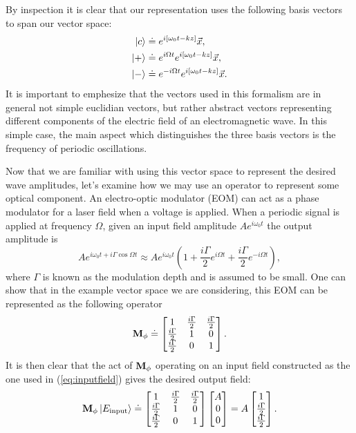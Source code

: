 By inspection it is clear that our representation uses the following basis vectors to span our vector space:
\begin{align}
\left| c \right>&\doteq e^{i[\omega_0 t-kz]}\vec{x}\notag, \\
\left| + \right>&\doteq e^{i\Omega t}e^{i[\omega_0 t-kz]}\vec{x}, \\
\left| - \right>&\doteq e^{-i\Omega t}e^{i[\omega_0 t-kz]}\vec{x}\notag.
\end{align}
It is important to emphesize that the vectors used in this formalism are in general not simple euclidian vectors, but rather abstract vectors representing different components of the electric field of an electromagnetic wave. %
In this simple case, the main aspect which distinguishes the three basis vectors is the frequency of periodic oscillations. %


Now that we are familiar with using this vector space to represent the desired wave amplitudes, let's examine how we may use an operator to represent some optical component. %
An electro-optic modulator (EOM) can act as a phase modulator for a laser field when a voltage is applied. %
When a periodic signal is applied at frequency $\Omega$, given an input field amplitude $Ae^{i\omega_0 t}$ the output amplitude is
\newcommand{\gammahalf}{\frac{i\Gamma}{2}}
\begin{equation}
\label{eq:inputfield}
Ae^{i\omega_0 t + i\Gamma \cos{\Omega t}}\approx Ae^{i\omega_0 t}\left(1+\gammahalf e^{i\Omega t}+\gammahalf e^{-i\Omega t}\right),
\end{equation}
where $\Gamma$ is known as the modulation depth and is assumed to be small. %
One can show that in the example vector space we are considering, this EOM can be represented as the following operator
\begin{equation}
\oper{M_\phi} \doteq 
\ms 
1          & \gammahalf & \gammahalf \\
\gammahalf & 1          & 0          \\
\gammahalf & 0          & 1 \\
\me.
\end{equation}
It is then clear that the act of $\mathbf{M_\phi}$ operating on an input field constructed as the one used in (\ref{eq:inputfield}) gives the desired output field:
\begin{equation}
\oper{M_\phi}\vect{E_{\text{input}}} \doteq \ms 
1          & \gammahalf & \gammahalf \\
\gammahalf & 1          & 0          \\
\gammahalf & 0          & 1 \\
\me
\ms A \\ 0 \\ 0 \me = A \ms  1 \\ \gammahalf \\ \gammahalf \me.
\end{equation}

